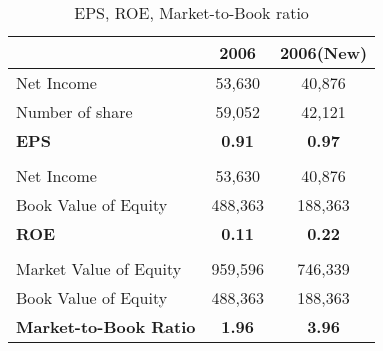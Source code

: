 \begin{table}[ht]
\centering
\begin{tabular}{@{}lcc@{}}
\toprule
                              & 2006          & 2006(New)     \\ \midrule
Net Income                    & 53,630        & 40,876        \\
Number of share               & 59,052        & 42,121        \\
\textbf{EPS}                  & \textbf{0.91} & \textbf{0.97} \\
                              &               &               \\
Net Income                    & 53,630        & 40,876        \\
Book Value of Equity          & 488,363       & 188,363       \\
\textbf{ROE}                  & \textbf{0.11} & \textbf{0.22} \\
                              &               &               \\
Market Value of Equity        & 959,596       & 746,339       \\
Book Value of Equity          & 488,363       & 188,363       \\
\textbf{Market-to-Book Ratio} & \textbf{1.96} & \textbf{3.96} \\ \bottomrule
\end{tabular}
\caption{EPS, ROE, Market-to-Book ratio}
\label{tab:q4-eps_roe_mtb}
\end{table}
